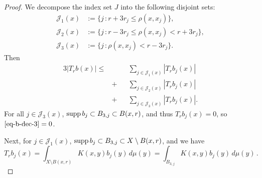 \begin{proof}
\leanok
We decompose the index set $J$ into the following disjoint sets:
\begin{align*}
    \mathcal{J}_1(x)&:=\{j\,: r+3r_j \le \rho(x,x_j) \},\\
    \mathcal{J}_2(x)&:=\{j\,: r-3r_j \le \rho(x,x_j) < r+3r_j\},\\
    \mathcal{J}_3(x)&:=\{j\,: \rho(x,x_j) < r-3r_j\}.
\end{align*}
Then
\begin{alignat}{3}
    \label{eq-b-dec-1}
    |T_r b(x)|\le&&&\sum_{j\in \mathcal{J}_1(x)} |T_rb_j(x)| \\
    \label{eq-b-dec-2}
                &+&&\sum_{j\in \mathcal{J}_2(x)} |T_rb_j(x)| \\
    \label{eq-b-dec-3}
                &+&&\sum_{j\in \mathcal{J}_3(x)} |T_rb_j(x)|.
\end{alignat}
For all $j\in \mathcal{J}_3(x)$, $\operatorname{\operatorname{supp}} b_j\subset B_{3,j}\subset B(x,r)$, and thus $T_rb_j(x)=0$, so $\eqref{eq-b-dec-3} = 0$.

Next, for $j\in \mathcal{J}_1(x)$, $\operatorname{\operatorname{supp}} b_j\subset B_{3,j}\subset X \setminus B(x,r)$, and we have
\begin{equation*}
    T_rb_j(x)=\int_{X\setminus B(x,r)} K(x,y) b_j(y)\,d\mu(y)=\int_{B_{3,j}} K(x,y) b_j(y)\,d\mu(y)\,.
\end{equation*}


\end{proof}
